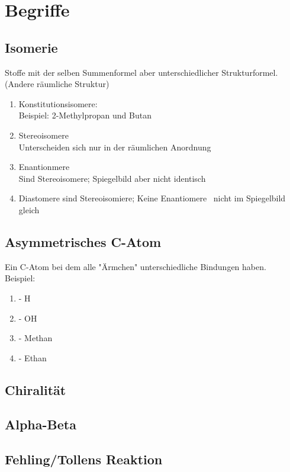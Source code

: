 
\section{Begriffe} \label{sec:begriffe}
\subsection{Isomerie}
Stoffe mit der selben Summenformel aber unterschiedlicher Strukturformel. (Andere räumliche Struktur)
\begin{enumerate}
    \item Konstitutionsisomere: \\
        Beispiel: 2-Methylpropan und Butan

    \item Stereoisomere \\
        Unterscheiden sich nur in der räumlichen Anordnung
    \item Enantionmere \\
        Sind Stereoisomere; Spiegelbild aber nicht identisch
    \item Diastomere
        sind Stereoisomiere; Keine Enantiomere \textrightarrow\ nicht im Spiegelbild gleich

\end{enumerate}
\subsection{Asymmetrisches C-Atom}
Ein C-Atom bei dem alle "Ärmchen" unterschiedliche Bindungen haben. \\
Beispiel:
\begin{enumerate}
    \item - H
    \item - OH
    \item - Methan
    \item - Ethan
\end{enumerate}

\subsection{Chiralität}
\subsection{Alpha-Beta}

\subsection{Fehling/Tollens Reaktion}
